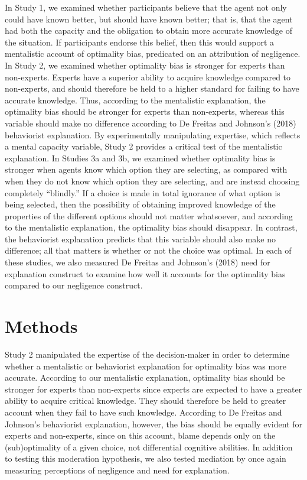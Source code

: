 \documentclass[
  man,floatsintext]{apa6}
\begin{document}
In Study 1, we examined whether participants believe that the agent not only could have known better, but should have known better; that is, that the agent had both the capacity and the obligation to obtain more accurate knowledge of the situation. If participants endorse this belief, then this would support a mentalistic account of optimality bias, predicated on an attribution of negligence. In Study 2, we examined whether optimality bias is stronger for experts than non-experts. Experts have a superior ability to acquire knowledge compared to non-experts, and should therefore be held to a higher standard for failing to have accurate knowledge. Thus, according to the mentalistic explanation, the optimality bias should be stronger for experts than non-experts, whereas this variable should make no difference according to De Freitas and Johnson's (2018) behaviorist explanation. By experimentally manipulating expertise, which reflects a mental capacity variable, Study 2 provides a critical test of the mentalistic explanation. In Studies 3a and 3b, we examined whether optimality bias is stronger when agents know which option they are selecting, as compared with when they do not know which option they are selecting, and are instead choosing completely ``blindly.'' If a choice is made in total ignorance of what option is being selected, then the possibility of obtaining improved knowledge of the properties of the different options should not matter whatsoever, and according to the mentalistic explanation, the optimality bias should disappear. In contrast, the behaviorist explanation predicts that this variable should also make no difference; all that matters is whether or not the choice was optimal. In each of these studies, we also measured De Freitas and Johnson's (2018) need for explanation construct to examine how well it accounts for the optimality bias compared to our negligence construct.

\hypertarget{methods}{%
\section{Methods}\label{methods}}

Study 2 manipulated the expertise of the decision-maker in order to determine whether a mentalistic or behaviorist explanation for optimality bias was more accurate. According to our mentalistic explanation, optimality bias should be stronger for experts than non-experts since experts are expected to have a greater ability to acquire critical knowledge. They should therefore be held to greater account when they fail to have such knowledge. According to De Freitas and Johnson's behaviorist explanation, however, the bias should be equally evident for experts and non-experts, since on this account, blame depends only on the (sub)optimality of a given choice, not differential cognitive abilities. In addition to testing this moderation hypothesis, we also tested mediation by once again measuring perceptions of negligence and need for explanation.
\end{document}
